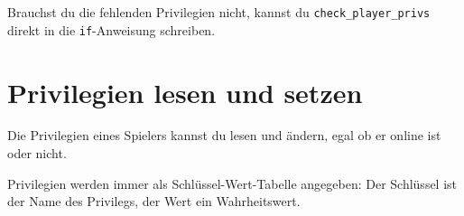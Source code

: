 Brauchst du die fehlenden Privilegien nicht, kannst du
\texttt{check\_\allowbreak{}player\_\allowbreak{}privs} direkt in die
\texttt{if}-Anweisung schreiben.

\begin{Shaded}
\begin{Highlighting}[]
     \OperatorTok{(}\OperatorTok{,} \OperatorTok{\{}  \OperatorTok{=}  \OperatorTok{\})}
     \OperatorTok{,} 
\end{Highlighting}
\end{Shaded}

\section{Privilegien lesen und
setzen}\label{privilegien-lesen-und-setzen}

Die Privilegien eines Spielers kannst du lesen und ändern, egal ob er
online ist oder nicht.

\begin{Shaded}
\begin{Highlighting}[]
  \OperatorTok{=} \OperatorTok{(}\OperatorTok{)}
\OperatorTok{(}\OperatorTok{(}\OperatorTok{))}

 \OperatorTok{=} 
\OperatorTok{(}\OperatorTok{,} \OperatorTok{)}
\end{Highlighting}
\end{Shaded}

Privilegien werden immer als Schlüssel-Wert-Tabelle angegeben: Der
Schlüssel ist der Name des Privilegs, der Wert ein Wahrheitswert.

\begin{Shaded}
\begin{Highlighting}[]
\OperatorTok{\{}
     \OperatorTok{=} \OperatorTok{,}
     \OperatorTok{=} \OperatorTok{,}
     \OperatorTok{=} \OperatorTok{,}
\OperatorTok{\},}
\end{Highlighting}
\end{Shaded}


